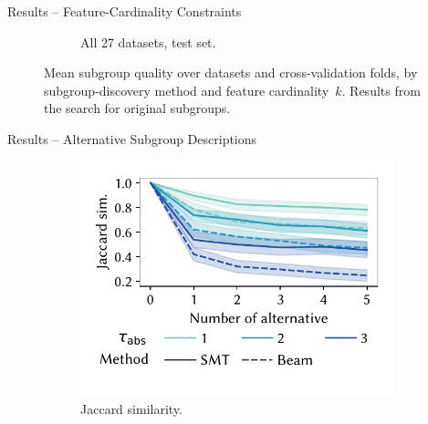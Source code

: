 \documentclass[en, navbaroff, handout]{sdqbeamer}
\begin{document}
\begin{frame}[t]{Results -- Feature-Cardinality Constraints}
\begin{figure}
\begin{subfigure}[t]{0.32\textwidth}
			\caption{All 27 datasets, test set.}
			\label{fig:csd:cardinality-test-nwracc-all-datasets}
		\end{subfigure}
		\caption*{
			Mean subgroup quality over datasets and cross-validation folds, by subgroup-discovery method and feature cardinality~$k$.
			Results from the search for original subgroups.
		}
		\label{fig:csd:cardinality}
	\end{figure}
\end{frame}

\begin{frame}[t]{Results -- Alternative Subgroup Descriptions}
	\begin{figure}[t]
		\centering
		\begin{subfigure}[t]{0.32\textwidth}
			\centering
			\includegraphics[width=\textwidth, trim=10 25 10 10, clip]{plots/csd-alternatives-jaccard.pdf}
			\caption{Jaccard similarity.}
			\label{fig:csd:alternatives-jaccard}
		\end{subfigure}
		\hfill
		\begin{subfigure}[t]{0.32\textwidth}

\end{subfigure}
\end{figure}
\end{frame}
\end{document}

